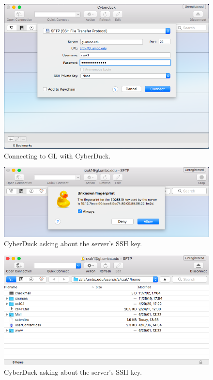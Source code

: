 \documentclass[letter,11pt]{article}
\begin{document}
\begin{figure}
\centering
\includegraphics[scale=0.6]{Images/macos_cyberduck_connect.png}
\caption{Connecting to GL with CyberDuck.}
\label{fig:maccyberduckconnect}
\end{figure}

\begin{figure}
\centering
\includegraphics[scale=0.6]{Images/macos_cyberduck_firsttime.png}
\caption{CyberDuck asking about the server's SSH key.}
\label{fig:maccyberduckconnectfirsttime}
\end{figure}

\begin{figure}
\centering
\includegraphics[scale=0.6]{Images/macos_cyberduck_connected.png}
\caption{CyberDuck asking about the server's SSH key.}
\label{fig:maccyberduckconnected}
\end{figure}
\end{document}

